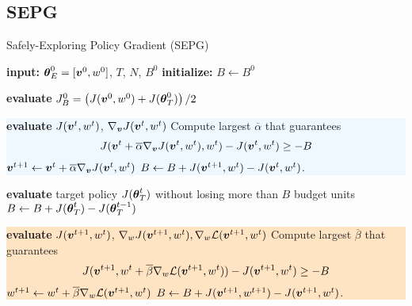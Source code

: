 \subsection{SEPG}
\begin{algorithm}[t]
\caption{Safely-Exploring Policy Gradient (SEPG)}
    \label{alg:adaptive_exp}
    \begin{algorithmic}[1] 
	\State \textbf{input:} $\vtheta_E^0 = [\vv^0, w^0]$, $T$, $N$, $B^0$
        \State \textbf{initialize:} $B \gets B^0$
        
        \State \textbf{evaluate} $\jbase[0] = \left(J(\vv^0, w^0) + J(\vtarget[0])\right) / 2$
			\State\newline
			\hspace*{-\fboxsep}\colorbox{aliceblue}{\parbox{\linewidth}{
            \State \textbf{evaluate} $J(\vv^t,w^t)$, $\nabla_{\vv}{J(\vv^t,w^t)}$
			\State Compute largest $\overline{\alpha}$ that guarantees \[J(\vv^t + \overline{\alpha} \nabla_{\vv}J(\vv^t, w^t), w^t) - J(\vv^t, w^t) \geq -B\]
            \State $\vv^{t+1} \gets \vv^t + \overline{\alpha}\nabla_{\vv}{J(\vv^t, w^t)}$  
           \State $B \gets B + J(\vv^{t+1}, w^t) - J(\vv^t, w^t)$.}}
\newline
			\hspace*{-\fboxsep}\colorbox{teagreen}{\parbox{\linewidth}{
	            \State \textbf{evaluate} target policy $J(\vtarget)$ without losing more than $B$ budget units \label{alg:evaluatetarget}
    		        \State $B \gets B + J(\vtarget) - J(\vtarget[t-1])$ 
        		 \EndIf   }}
      \State\newline
\hspace*{-\fboxsep}\colorbox{bisque}{\parbox{\linewidth}{      
            \State \textbf{evaluate} $J(\vv^{t+1}, w^t)$, $\nabla_{w}{J(\vv^{t+1}, w^t)}, \gradDelta(\vv^{t+1},w^t)$ \label{alg:evaluate2}
            \State Compute largest $\overline{\beta}$ that guarantees \[J(\vv^{t+1}, w^t + \overline{\beta} \gradDelta(\vv^{t+1}, w^t)) - J(\vv^{t+1}, w^t) \geq -B \]
            \State $w^{t+1} \gets w^t + \overline{ \beta}\gradDelta(\vv^{t+1},w^t)$             
            \State $B \gets B + J(\vv^{t+1}, w^{t+1}) - J(\vv^{t+1}, w^t)$. }}
        \EndFor
    \end{algorithmic}
\end{algorithm}


